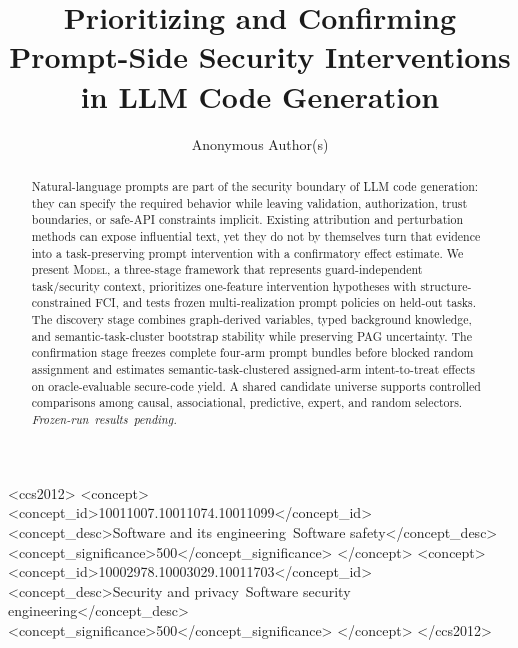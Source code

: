 \documentclass[acmsmall,screen,review,anonymous]{acmart}
\newcommand{\model}{\textsc{Model}\xspace}
\newcommand{\resultslot}{\mbox{\emph{Frozen-run results pending.}}}
\begin{document}
\title{Prioritizing and Confirming Prompt-Side Security Interventions in LLM
Code Generation}

\author{Anonymous Author(s)}

\begin{abstract}
Natural-language prompts are part of the security boundary of LLM code
generation: they can specify the required behavior while leaving validation,
authorization, trust boundaries, or safe-API constraints implicit. Existing
attribution and perturbation methods can expose influential text, yet they do
not by themselves turn that evidence into a task-preserving prompt
intervention with a confirmatory effect estimate. We present \model, a
three-stage framework that represents guard-independent task/security context,
prioritizes one-feature intervention hypotheses with structure-constrained
FCI, and tests frozen multi-realization prompt policies on held-out tasks. The
discovery stage combines graph-derived variables, typed background knowledge,
and semantic-task-cluster bootstrap stability while preserving PAG
uncertainty. The confirmation stage freezes complete four-arm prompt bundles
before blocked random assignment and estimates semantic-task-clustered
assigned-arm intent-to-treat effects on oracle-evaluable secure-code yield. A
shared candidate universe supports controlled comparisons among causal,
associational, predictive, expert, and random selectors. \resultslot
\end{abstract}

\begin{CCSXML}
<ccs2012>
 <concept>
  <concept_id>10011007.10011074.10011099</concept_id>
  <concept_desc>Software and its engineering~Software safety</concept_desc>
  <concept_significance>500</concept_significance>
 </concept>
 <concept>
  <concept_id>10002978.10003029.10011703</concept_id>
  <concept_desc>Security and privacy~Software security engineering</concept_desc>
  <concept_significance>500</concept_significance>
 </concept>
</ccs2012>
\end{CCSXML}


\maketitle
\raggedbottom
\end{document}
